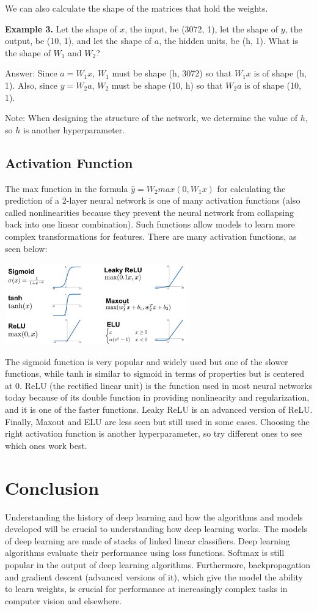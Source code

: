 \documentclass{article}
\begin{document}
We can also calculate the shape of the matrices that hold the weights.

\textbf{Example 3.}
Let the shape of $x$, the input, be (3072, 1), let the shape of $y$, the output, be (10, 1), and let the shape of $a$, the hidden units, be (h, 1). What is the shape of $W_1$ and $W_2$?

Answer: Since $a = W_1x$, $W_1$ must be shape (h, 3072) so that $W_1x$ is of shape (h, 1). Also, since $y = W_2a$, $W_2$ must be shape (10, h) so that $W_2a$ is of shape (10, 1).

Note: When designing the structure of the network, we determine the value of $h$, so $h$ is another hyperparameter.

\subsection{Activation Function}
The max function in the formula $\hat{y} = W_2max(0, W_1x)$ for calculating the prediction of a 2-layer neural network is one of many activation functions (also called nonlinearities because they prevent the neural network from collapsing back into one linear combination). Such functions allow models to learn more complex transformations for features. There are many activation functions, as seen below:

\includegraphics[width=300px]{activation_functions.png}

The sigmoid function is very popular and widely used but one of the slower functions, while tanh is similar to sigmoid in terms of properties but is centered at 0. ReLU (the rectified linear unit) is the function used in most neural networks today because of its double function in providing nonlinearity and regularization, and it is one of the faster functions. Leaky ReLU is an advanced version of ReLU. Finally, Maxout and ELU are less seen but still used in some cases. Choosing the right activation function is another hyperparameter, so try different ones to see which ones work best.

\section{Conclusion}
Understanding the history of deep learning and how the algorithms and models developed will be crucial to understanding how deep learning works. The models of deep learning are made of stacks of linked linear classifiers. Deep learning algorithms evaluate their performance using loss functions. Softmax is still popular in the output of deep learning algorithms. Furthermore, backpropagation and gradient descent (advanced versions of it), which give the model the ability to learn weights, is crucial for performance at increasingly complex tasks in computer vision and elsewhere.
\end{document}
